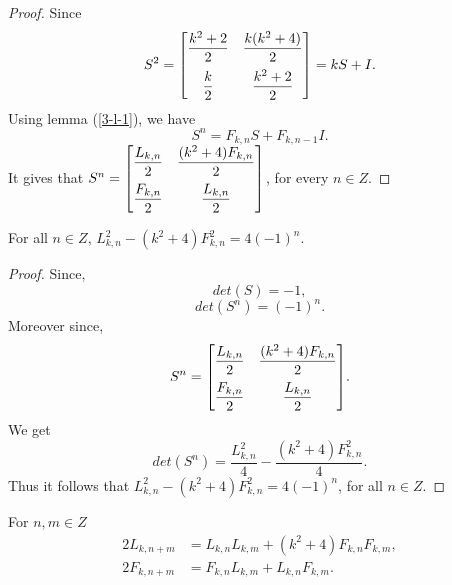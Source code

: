 \begin{proof}
Since $$S^2=\begin{bmatrix}{}
    \dfrac{k^2+2}{2} & \dfrac{k(k^2+4)}{2} \vspace{.2cm}\\
    \dfrac{k}{2}& \dfrac{k^2+2}{2} \\
	\end{bmatrix}=kS+I.$$
	Using lemma (\ref{3-l-1}), we have
	$$S^n=F_{k,n}S+F_{k,n-1}I.$$
	It gives that
	$S^n={
 \begin{bmatrix}{}
    \dfrac{L_{k,n}}{2} & \dfrac{(k^2+4)F_{k,n}}{2}\vspace{.2cm} \\
    \dfrac{F_{k,n}}{2} & \dfrac{L_{k,n}}{2} \\
	\end{bmatrix}
	}$, for every $n\in Z$.
\end{proof}
\begin{lemma}For all $n\in Z$,
$L^2_{k,n}-(k^2+4)F^2_{k,n}=4(-1)^n.$ 
\end{lemma}
\begin{proof}
Since, $$det(S)=-1,$$
$$det(S^n)=(-1)^n.$$
Moreover since,
$$S^n={
 \begin{bmatrix}{}
    \dfrac{L_{k,n}}{2} & \dfrac{(k^2+4)F_{k,n}}{2} \vspace{.2cm}\\
    \dfrac{F_{k,n}}{2} & \dfrac{L_{k,n}}{2} \\
	\end{bmatrix}
	}.$$
	We get
	$$det(S^n)=\frac{L^2_{k,n}}{4}-\frac{(k^2+4)F^2_{k,n}}{4}.$$
Thus it follows that
$L^2_{k,n}-(k^2+4)F^2_{k,n}=4(-1)^n$, for all $n\in Z$.
\end{proof}
\begin{lemma}For $n,m\in Z$ \label{3-l-2}
\begin{align}
2L_{k,n+m}&=L_{k,n}L_{k,m}+(k^2+4)F_{k,n}F_{k,m},\\ 
2F_{k,n+m}&=F_{k,n}L_{k,m}+L_{k,n}F_{k,m}.
\end{align}
\end{lemma}
